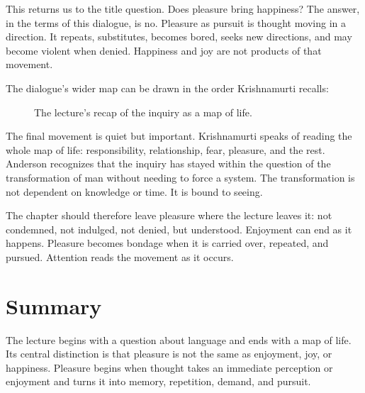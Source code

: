 This returns us to the title question. Does pleasure bring happiness? The answer, in the terms of this dialogue, is no. Pleasure as pursuit is thought moving in a direction. It repeats, substitutes, becomes bored, seeks new directions, and may become violent when denied. Happiness and joy are not products of that movement.

The dialogue's wider map can be drawn in the order Krishnamurti recalls:
\begin{figure}
\centering
{}

The lecture's recap of the inquiry as a map of life.
\end{figure}

The final movement is quiet but important. Krishnamurti speaks of reading the whole map of life: responsibility, relationship, fear, pleasure, and the rest. Anderson recognizes that the inquiry has stayed within the question of the transformation of man without needing to force a system. The transformation is not dependent on knowledge or time. It is bound to seeing.

The chapter should therefore leave pleasure where the lecture leaves it: not condemned, not indulged, not denied, but understood. Enjoyment can end as it happens. Pleasure becomes bondage when it is carried over, repeated, and pursued. Attention reads the movement as it occurs.

\section{Summary}

The lecture begins with a question about language and ends with a map of life. Its central distinction is that pleasure is not the same as enjoyment, joy, or happiness. Pleasure begins when thought takes an immediate perception or enjoyment and turns it into memory, repetition, demand, and pursuit.

